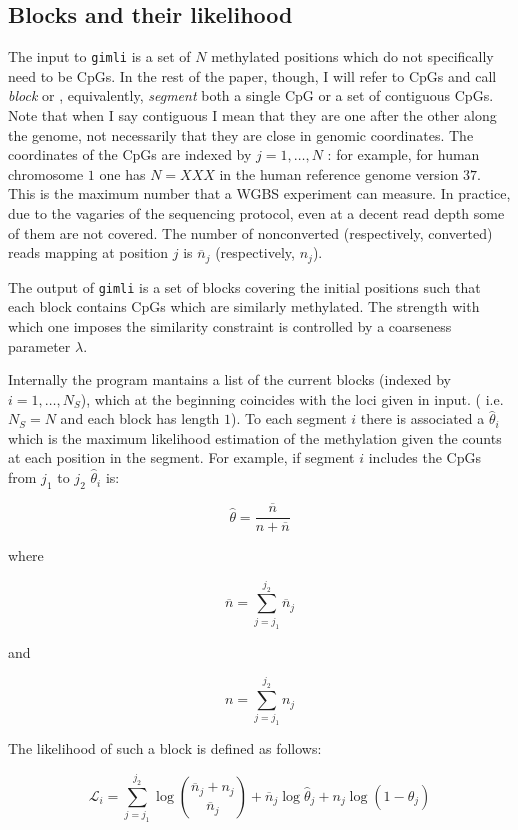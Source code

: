 \documentclass[12pt]{amsart}
\newcommand{\lik}{\ensuremath{\mathcal{L}}}
\newcommand{\gimli}{\texttt{gimli}}
\begin{document}
\subsection{Blocks and their likelihood}
The  input to \gimli{} is a set of $N$ methylated positions 
which do not specifically need to be CpGs.
In the rest of the paper, though, I will refer to CpGs and 
call {\em block} or , equivalently, {\em segment}
both a single CpG or a set of contiguous CpGs. 
Note that when I say contiguous I mean that they are one
after the other along the genome, not necessarily that they are
close in genomic coordinates. The coordinates of the CpGs are 
indexed by $j=1,\dots,N$ : for example, for human chromosome $1$ 
one has $N = XXX $ in the human reference genome version $37$.
This is the maximum number that a WGBS experiment can measure. In practice,
due to the vagaries of the sequencing protocol, even at a decent read depth
some of them are not covered. 
The number of nonconverted (respectively, converted) reads mapping at 
position $j$ is $\overline{n}_j$ (respectively, $n_j$). 


The output of \gimli{} is a set of blocks 
covering the initial positions 
such that each block contains CpGs which are similarly
methylated. The strength with which
one imposes the similarity constraint
is controlled by a coarseness parameter $\lambda$.

Internally the program  mantains a list of the current  
blocks (indexed by $i=1,\dots,N_S$), 
which at the beginning 
coincides with the loci given in input. 
( i.e.  $N_S=N$ and each block has length $1$). 
To each segment $i$ there is associated a $\hat{\theta}_i$ which
is the maximum likelihood estimation of the methylation given the counts
at each position in the segment. 
For example, if segment $i$ includes the CpGs from $j_1$ to $j_2$
$\hat{\theta}_i$ is:

\[
\hat{\theta}=\frac{\overline{n}}{n + \overline{n}}
\]

where

\[
\overline{n}=\sum_{j=j_1}^{j_2} \overline{n}_j
\]

and

\[
n=\sum_{j=j_1}^{j_2} n_j
\]

The likelihood of such a block is defined as follows:

\begin{equation}
\lik_i=\sum_{j=j_1}^{j_2} 
\log {\overline{n}_j+n_j \choose \overline{n}_j} +
	{\overline{n}_j}\log\hat{\theta}_j+
	n_j\log(1-\hat{\theta}_j)
\end{equation}
\label{loglik}
\end{document}
